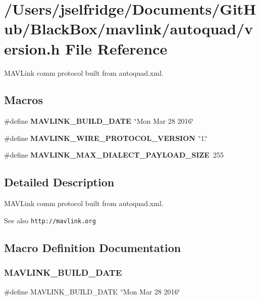 \section{/\+Users/jselfridge/\+Documents/\+Git\+Hub/\+Black\+Box/mavlink/autoquad/version.h File Reference}
\label{autoquad_2version_8h}


M\+A\+V\+Link comm protocol built from autoquad.\+xml.  


\subsection*{Macros}
\begin{DoxyCompactItemize}
\item 
\#define \textbf{ M\+A\+V\+L\+I\+N\+K\+\_\+\+B\+U\+I\+L\+D\+\_\+\+D\+A\+TE}~\char`\"{}Mon Mar 28 2016\char`\"{}
\item 
\#define \textbf{ M\+A\+V\+L\+I\+N\+K\+\_\+\+W\+I\+R\+E\+\_\+\+P\+R\+O\+T\+O\+C\+O\+L\+\_\+\+V\+E\+R\+S\+I\+ON}~\char`\"{}1.\char`\"{}
\item 
\#define \textbf{ M\+A\+V\+L\+I\+N\+K\+\_\+\+M\+A\+X\+\_\+\+D\+I\+A\+L\+E\+C\+T\+\_\+\+P\+A\+Y\+L\+O\+A\+D\+\_\+\+S\+I\+ZE}~255
\end{DoxyCompactItemize}


\subsection{Detailed Description}
M\+A\+V\+Link comm protocol built from autoquad.\+xml. 

\begin{DoxySeeAlso}{See also}
{\tt http\+://mavlink.\+org} 
\end{DoxySeeAlso}


\subsection{Macro Definition Documentation}
\mbox{\label{autoquad_2version_8h_ab31250f0c93f71e42393b68a7cfe7585}} 
\subsubsection{M\+A\+V\+L\+I\+N\+K\+\_\+\+B\+U\+I\+L\+D\+\_\+\+D\+A\+TE}
{\footnotesize\ttfamily \#define M\+A\+V\+L\+I\+N\+K\+\_\+\+B\+U\+I\+L\+D\+\_\+\+D\+A\+TE~\char`\"{}Mon Mar 28 2016\char`\"{}}

